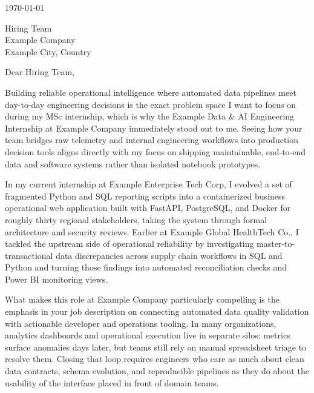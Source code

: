 \vspace{0.4em}
\today

\vspace{0.4em}
\noindent
Hiring Team\\
Example Company\\
Example City, Country

\vspace{0.3em}

Dear Hiring Team,

Building reliable operational intelligence where automated data pipelines meet day-to-day engineering decisions is the exact problem space I want to focus on during my MSc internship, which is why the Example Data \& AI Engineering Internship at Example Company immediately stood out to me. Seeing how your team bridges raw telemetry and internal engineering workflows into production decision tools aligns directly with my focus on shipping maintainable, end-to-end data and software systems rather than isolated notebook prototypes.

In my current internship at Example Enterprise Tech Corp, I evolved a set of fragmented Python and SQL reporting scripts into a containerized business operational web application built with FastAPI, PostgreSQL, and Docker for roughly thirty regional stakeholders, taking the system through formal architecture and security reviews. Earlier at Example Global HealthTech Co., I tackled the upstream side of operational reliability by investigating master-to-transactional data discrepancies across supply chain workflows in SQL and Python and turning those findings into automated reconciliation checks and Power BI monitoring views.

What makes this role at Example Company particularly compelling is the emphasis in your job description on connecting automated data quality validation with actionable developer and operations tooling. In many organizations, analytics dashboards and operational execution live in separate silos: metrics surface anomalies days later, but teams still rely on manual spreadsheet triage to resolve them. Closing that loop requires engineers who care as much about clean data contracts, schema evolution, and reproducible pipelines as they do about the usability of the interface placed in front of domain teams.


